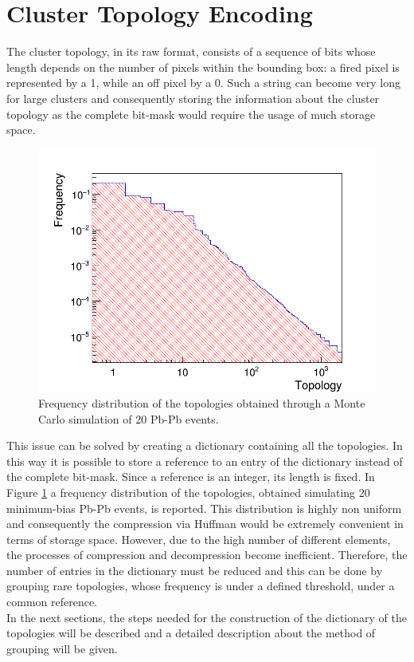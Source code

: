\section{Cluster Topology Encoding}
The cluster topology, in its raw format, consists of a sequence of bits whose length depends on the number of pixels within the bounding box: a fired pixel is represented by a 1, while an off pixel by a 0. Such a string can become very long for large clusters and consequently storing the information about the cluster topology as the complete bit-mask would require the usage of much storage space.
%
\begin{figure}
  \centering
  \includegraphics[scale=0.5]{figures/ciccio.png}
  \caption{Frequency distribution of the topologies obtained through a Monte Carlo simulation of 20 Pb-Pb events.}
  \label{fig:topdistro}
\end{figure}
%
This issue can be solved by creating a dictionary containing all the topologies. In this way it is possible to store a reference to an entry of the dictionary instead of the complete bit-mask. Since a reference is an integer, its length is fixed. In Figure \ref{fig:topdistro} a frequency distribution of the topologies, obtained simulating 20 minimum-bias Pb-Pb events, is reported. This distribution is highly non uniform and consequently the compression via Huffman would be extremely convenient in terms of storage space. However, due to the high number of different elements, the processes of compression and decompression become inefficient. Therefore, the number of entries in the dictionary must be reduced and this can be done by grouping rare topologies, whose frequency is under a defined threshold, under a common reference.\\
In the next sections, the steps needed for the construction of the dictionary of the topologies will be described and a detailed description about the method of grouping will be given.

